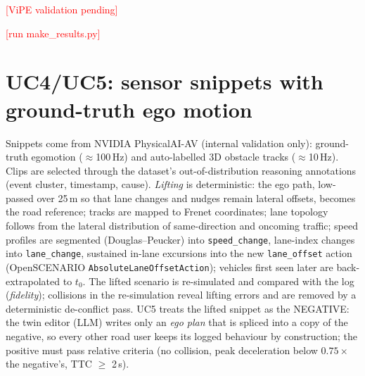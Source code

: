 \documentclass[10pt,a4paper]{article}
\newcommand{\todo}[1]{\textcolor{red}{[#1]}}
\newcommand{\ResultsUCtwo}{\todo{run make\_results.py}}%
\providecommand{\ResultsVipePAI}{\todo{ViPE validation pending}}
\begin{document}
\ResultsVipePAI

\ResultsUCtwo

\section{UC4/UC5: sensor snippets with ground-truth ego motion}
Snippets come from NVIDIA PhysicalAI-AV (internal validation only): ground-truth egomotion ($\approx$100\,Hz) and
auto-labelled 3D obstacle tracks ($\approx$10\,Hz). Clips are selected through the dataset's out-of-distribution
reasoning annotations (event cluster, timestamp, cause). \emph{Lifting} is deterministic: the ego path, low-passed
over 25\,m so that lane changes and nudges remain lateral offsets, becomes the road reference; tracks are mapped to
Frenet coordinates; lane topology follows from the lateral distribution of same-direction and oncoming traffic;
speed profiles are segmented (Douglas--Peucker) into \texttt{speed\_change}, lane-index changes into
\texttt{lane\_change}, sustained in-lane excursions into the new \texttt{lane\_offset} action (OpenSCENARIO
\texttt{AbsoluteLaneOffsetAction}); vehicles first seen later are back-extrapolated to $t_0$. The lifted scenario
is re-simulated and compared with the log (\emph{fidelity}); collisions in the re-simulation reveal lifting errors and
are removed by a deterministic de-conflict pass. UC5 treats the lifted snippet as the NEGATIVE: the twin editor (LLM)
writes only an \emph{ego plan} that is spliced into a copy of the negative, so every other road user keeps its logged
behaviour by construction; the positive must pass relative criteria (no collision, peak deceleration below
$0.75\times$ the negative's, TTC $\geq$ 2\,s).
\end{document}
